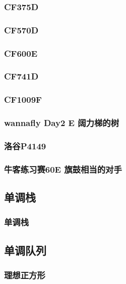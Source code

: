 \documentclass[10pt,a4paper]{article}
\begin{document}
\subsubsection{CF375D}

\subsubsection{CF570D}

\subsubsection{CF600E}

\subsubsection{CF741D}

\subsubsection{CF1009F}

\subsubsection{wannafly Day2 E 阔力梯的树}

\subsubsection{洛谷P4149}

\subsubsection{牛客练习赛60E 旗鼓相当的对手}

\subsection{单调栈}
\subsubsection{单调栈}

\subsection{单调队列}
\subsubsection{理想正方形}

\end{document}
